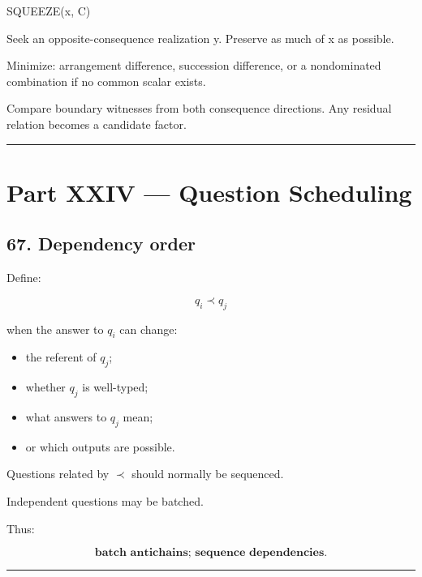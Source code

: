 \documentclass[
]{article}
\newenvironment{Shaded}{}{}
\newcommand{\NormalTok}[1]{#1}
\providecommand{\tightlist}{%
  \setlength{\itemsep}{0pt}\setlength{\parskip}{0pt}}
\begin{document}
\begin{Shaded}
\begin{Highlighting}[]
\NormalTok{SQUEEZE(x, C)}

\NormalTok{Seek an opposite{-}consequence realization y.}
\NormalTok{Preserve as much of x as possible.}

\NormalTok{Minimize:}
\NormalTok{    arrangement difference,}
\NormalTok{    succession difference,}
\NormalTok{    or a nondominated combination if no common scalar exists.}

\NormalTok{Compare boundary witnesses from both consequence directions.}
\NormalTok{Any residual relation becomes a candidate factor.}
\end{Highlighting}
\end{Shaded}

\begin{center}\rule{0.5\linewidth}{0.5pt}\end{center}

\section{Part XXIV --- Question
Scheduling}\label{part-xxiv-question-scheduling}

\subsection{67. Dependency order}\label{dependency-order}

Define:

\[
q_i\prec q_j
\]

when the answer to \(q_i\) can change:

\begin{itemize}
\tightlist
\item
  the referent of \(q_j\);
\item
  whether \(q_j\) is well-typed;
\item
  what answers to \(q_j\) mean;
\item
  or which outputs are possible.
\end{itemize}

Questions related by \(\prec\) should normally be sequenced.

Independent questions may be batched.

Thus:

\[
\boxed{
\textbf{batch antichains; sequence dependencies.}
}
\]

\begin{center}\rule{0.5\linewidth}{0.5pt}\end{center}
\end{document}
